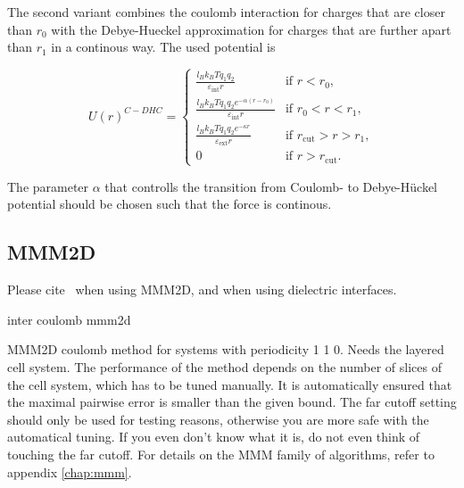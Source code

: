 The second variant combines the coulomb interaction for charges that are closer than $r_0$ with the Debye-Hueckel approximation for charges that are further apart than $r_1$ in a continous way. The used potential is 

\begin{equation}
  U(r)^{C-DHC} = 
  \begin{cases} 
    \frac{l_B k_B T q_1 q_2}{\varepsilon_{\text{int}} r} & \text{if } r < r_0, \\ 
    \frac{l_B k_B T q_1 q_2 e^{-\alpha (r - r_0)}}{\varepsilon_{\text{int}} r} & \text{if } r_0 < r < r_1,  \\
    \frac{l_B k_B T q_1 q_2 e^{-\kappa r}}{\varepsilon_{\text{ext}} r} & \text{if } r_{\text{cut}} > r > r_1,  \\
    0 & \text{if } r > r_{\text{cut}}.
  \end{cases}
\end{equation}

The parameter $\alpha$ that controlls the transition from Coulomb- to Debye-H\"uckel potential should be chosen such that the force is continous.

\subsection{MMM2D}

\begin{citebox}
  Please cite~ when using MMM2D, and
   when using dielectric interfaces.
\end{citebox}


\begin{essyntax}
 inter coulomb  mmm2d 
  \begin{features}
  \end{features}
\end{essyntax}
MMM2D coulomb method for systems with periodicity 1 1 0. Needs the
layered cell system. The performance of the method depends on the
number of slices of the cell system, which has to be tuned manually.
It is automatically ensured that the maximal pairwise error is smaller
than the given bound. The far cutoff setting should only be used for
testing reasons, otherwise you are more safe with the automatical
tuning. If you even don't know what it is, do not even think of
touching the far cutoff. For details on the MMM family of algorithms,
refer to appendix \vref{chap:mmm}.

